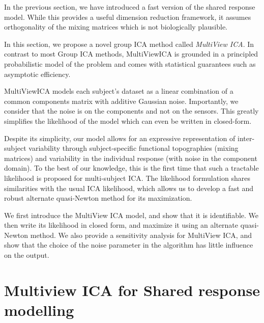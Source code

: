In the previous section, we have introduced a fast version of the shared
response model. While this provides a useful dimension reduction framework, it
assumes orthogonality of the mixing matrices which is not biologically
plausible.

In this section, we propose a novel group ICA method called \emph{MultiView ICA}.
In contrast to most Group ICA methods, MultiViewICA is grounded in a principled
probabilistic model of the problem and comes with statistical guarantees such as
asymptotic efficiency.

MultiViewICA models each subject's dataset as a linear combination of a common
components matrix with additive Gaussian noise.
% 
Importantly, we consider that the noise is on the components and not on
the sensors.
% 
This greatly simplifies the likelihood of the model which can even be
written in closed-form.

Despite its simplicity, our model allows for an expressive representation of inter-subject variability through subject-specific functional topographies (mixing matrices) and variability in the individual response (with noise in the component domain).
% 
To the best of our knowledge, this is the first time that such a tractable likelihood is proposed for multi-subject ICA.
% 
The likelihood formulation shares similarities with the usual ICA likelihood, which allows us to develop a fast and robust alternate quasi-Newton method for its maximization.

We first introduce the MultiView ICA model, and show that it is identifiable. We then write its likelihood in closed form, and maximize it using an alternate quasi-Newton method.
%
We also provide a sensitivity analysis for MultiView ICA, and show that the choice of the noise parameter in the algorithm has little influence on the output.
\section{Multiview ICA for Shared response modelling}
\label{sec:mvica}
